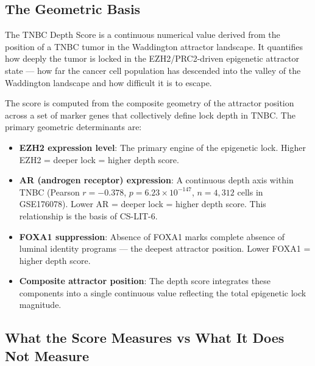 \documentclass[12pt, a4paper]{article}
\begin{document}
\subsection{The Geometric Basis}

The TNBC Depth Score is a continuous numerical
value derived from the position of a TNBC tumor
in the Waddington attractor landscape. It
quantifies how deeply the tumor is locked in the
EZH2/PRC2-driven epigenetic attractor state ---
how far the cancer cell population has descended
into the valley of the Waddington landscape and
how difficult it is to escape.

The score is computed from the composite geometry
of the attractor position across a set of
marker genes that collectively define lock depth
in TNBC. The primary geometric determinants are:

\begin{itemize}
    \item \textbf{EZH2 expression level}: The
    primary engine of the epigenetic lock.
    Higher EZH2 = deeper lock = higher depth score.

    \item \textbf{AR (androgen receptor)
    expression}: A continuous depth axis within
    TNBC (Pearson $r = -0.378$,
    $p = 6.23 \times 10^{-147}$,
    $n = 4{,}312$ cells in GSE176078).
    Lower AR = deeper lock = higher depth score.
    This relationship is the basis of CS-LIT-6.

    \item \textbf{FOXA1 suppression}: Absence of
    FOXA1 marks complete absence of luminal
    identity programs --- the deepest attractor
    position. Lower FOXA1 = higher depth score.

    \item \textbf{Composite attractor position}:
    The depth score integrates these components
    into a single continuous value reflecting
    the total epigenetic lock magnitude.
\end{itemize}

\subsection{What the Score Measures vs What
It Does Not Measure}
\end{document}
